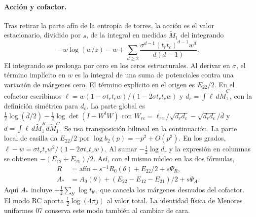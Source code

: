 \paragraph{Acción y cofactor.}
Tras retirar la parte afín de la entropía de torres, la acción es el valor estacionario, dividido
por $s$, de la integral en medidas $\widetilde M_1$ del integrando
\[
 -w\log(w/z)-w+
 \sum_{d\ge2}\frac{\sigma^{d-1}(t_rt_c)^{d-1}w^d}{d(d-1)} .
\]
El integrando se prolonga por cero en los ceros estructurales. Al derivar en $\sigma$,
el término implícito en $w$ es la integral de una suma de potenciales contra una variación
de márgenes cero. El término explícito en el origen es $E_{22}/2$.
En el cofactor escribimos $\ell=w(1-\sigma t_rt_c w)/(1-2\sigma t_rt_c w)$ y
$d_r=\int\ell\,d\widetilde M_1^C$, con la definición simétrica para $d_c$.
La parte global es $\tfrac12\log(\bar d/2)-\tfrac12\log\det(I-W^tW)$ con
$W_{rc}=\ell_{rc}/\sqrt{d_rd_c}-\sqrt{d_rd_c}/\bar d$ y
$\bar d=\int\ell\,d\widetilde M_1^Rd\widetilde M_1^C$.
Se usa transposición bilineal en la continuación. La parte local de casilla da $E_{22}/2$ por
$\log b_2(p)=-p^2+O(p^3)$. En los grados, $\ell-w=\sigma t_rt_c w^2/(1-2\sigma t_rt_c w)$.
Al sumar $-\tfrac12\log d_r$ y la expresión en columnas se obtienen $-(E_{12}+E_{21})/2$.
Así, con el mismo núcleo en las dos fórmulas,
\begin{align*}
 R&=\text{afín}+s^{-1}R_0(\theta)+E_{22}/2+s\Psi_R,\\
 A_*&=A_0(\theta)+(E_{22}-E_{12}-E_{21})/2+s\Psi_A .
\end{align*}
Aquí $A_*$ incluye $+\tfrac12\sum_{b'}\log t_{b'}$, que cancela los márgenes desnudos del
cofactor. El modo RC aporta $\tfrac12\log(4\pi j)$ al valor total. La identidad física de
Menores uniformes 07 conserva este modo también al cambiar de cara.
